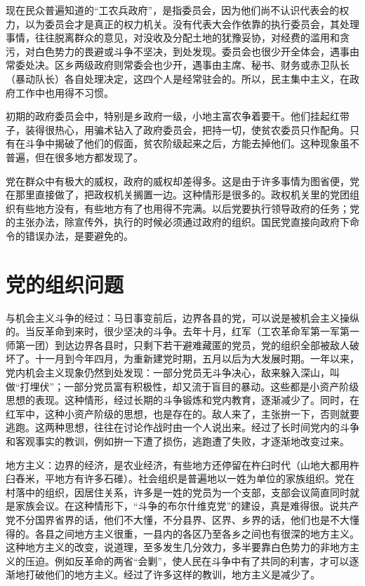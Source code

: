 现在民众普遍知道的“工农兵政府”，是指委员会，因为他们尚不认识代表会的权力，以为委员会才是真正的权力机关。没有代表大会作依靠的执行委员会，其处理事情，往往脱离群众的意见，对没收及分配土地的犹豫妥协，对经费的滥用和贪污，对白色势力的畏避或斗争不坚决，到处发现。委员会也很少开全体会，遇事由常委处决。区乡两级政府则常委会也少开，遇事由主席、秘书、财务或赤卫队长（暴动队长）各自处理决定，这四个人是经常驻会的。所以，民主集中主义，在政府工作中也用得不习惯。

初期的政府委员会中，特别是乡政府一级，小地主富农争着要干。他们挂起红带子，装得很热心，用骗术钻入了政府委员会，把持一切，使贫农委员只作配角。只有在斗争中揭破了他们的假面，贫农阶级起来之后，方能去掉他们。这种现象虽不普遍，但在很多地方都发现了。

党在群众中有极大的威权，政府的威权却差得多。这是由于许多事情为图省便，党在那里直接做了，把政权机关搁置一边。这种情形是很多的。政权机关里的党团组织有些地方没有，有些地方有了也用得不完满。以后党要执行领导政府的任务；党的主张办法，除宣传外，执行的时候必须通过政府的组织。国民党直接向政府下命令的错误办法，是要避免的。

\section{党的组织问题}

与机会主义斗争的经过：马日事变前后，边界各县的党，可以说是被机会主义操纵的。当反革命到来时，很少坚决的斗争。去年十月，红军（工农革命军第一军第一师第一团）到达边界各县时，只剩下若干避难藏匿的党员，党的组织全部被敌人破坏了。十一月到今年四月，为重新建党时期，五月以后为大发展时期。一年以来，党内机会主义现象仍然到处发现：一部分党员无斗争决心，敌来躲入深山，叫做“打埋伏”；一部分党员富有积极性，却又流于盲目的暴动。这些都是小资产阶级思想的表现。这种情形，经过长期的斗争锻炼和党内教育，逐渐减少了。同时，在红军中，这种小资产阶级的思想，也是存在的。敌人来了，主张拚一下，否则就要逃跑。这两种思想，往往在讨论作战时由一个人说出来。经过了长时间党内的斗争和客观事实的教训，例如拚一下遭了损伤，逃跑遭了失败，才逐渐地改变过来。

地方主义：边界的经济，是农业经济，有些地方还停留在杵臼时代（山地大都用杵臼舂米，平地方有许多石碓）。社会组织是普遍地以一姓为单位的家族组织。党在村落中的组织，因居住关系，许多是一姓的党员为一个支部，支部会议简直同时就是家族会议。在这种情形下，“斗争的布尔什维克党”的建设，真是难得很。说共产党不分国界省界的话，他们不大懂，不分县界、区界、乡界的话，他们也是不大懂得的。各县之间地方主义很重，一县内的各区乃至各乡之间也有很深的地方主义。这种地方主义的改变，说道理，至多发生几分效力，多半要靠白色势力的非地方主义的压迫。例如反革命的两省“会剿”，使人民在斗争中有了共同的利害，才可以逐渐地打破他们的地方主义。经过了许多这样的教训，地方主义是减少了。

